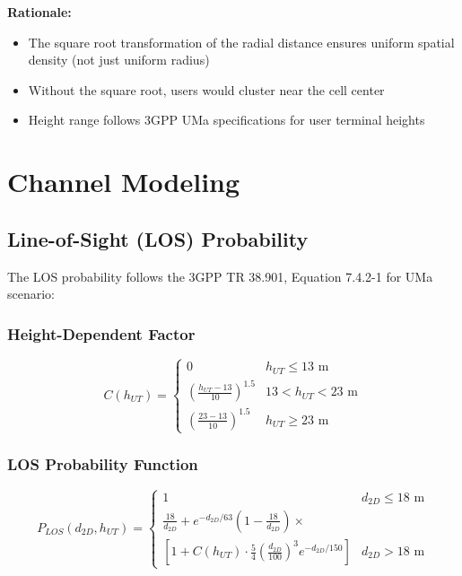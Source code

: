 \documentclass[12pt,a4paper]{article}
\begin{document}
\textbf{Rationale:}
\begin{itemize}
    \item The square root transformation of the radial distance ensures uniform spatial density (not just uniform radius)
    \item Without the square root, users would cluster near the cell center
    \item Height range follows 3GPP UMa specifications for user terminal heights
\end{itemize}

\section{Channel Modeling}

\subsection{Line-of-Sight (LOS) Probability}

The LOS probability follows the 3GPP TR 38.901, Equation 7.4.2-1 for UMa scenario:

\subsubsection{Height-Dependent Factor}

\begin{equation}
C(h_{UT}) = \begin{cases}
0 & h_{UT} \leq 13 \text{ m} \\
\left(\frac{h_{UT} - 13}{10}\right)^{1.5} & 13 < h_{UT} < 23 \text{ m} \\
\left(\frac{23 - 13}{10}\right)^{1.5} & h_{UT} \geq 23 \text{ m}
\end{cases}
\end{equation}

\subsubsection{LOS Probability Function}

\begin{equation}
P_{LOS}(d_{2D}, h_{UT}) = \begin{cases}
1 & d_{2D} \leq 18 \text{ m} \\
\displaystyle\frac{18}{d_{2D}} + e^{-d_{2D}/63}\left(1 - \frac{18}{d_{2D}}\right) \times \\
\displaystyle\left[1 + C(h_{UT}) \cdot \frac{5}{4}\left(\frac{d_{2D}}{100}\right)^3 e^{-d_{2D}/150}\right] & d_{2D} > 18 \text{ m}
\end{cases}
\end{equation}
\end{document}
